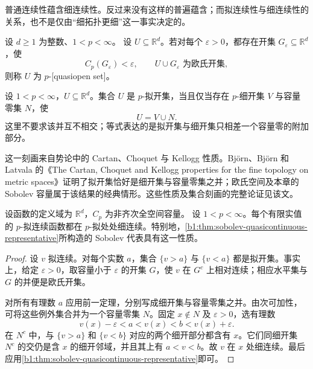 普通连续性蕴含细连续性。反过来没有这样的普遍蕴含；而拟连续性与细连续性的关系，也不是仅由“细拓扑更细”这一事实决定的。

\begin{definition}\label{b1:def:p-quasiopen-set}
设 \(d\geq1\) 为整数、\(1<p<\infty\)。
设 \(U\subseteq\mathbb R^d\)。若对每个 \(\varepsilon>0\)，都存在开集 \(G_\varepsilon\subseteq\mathbb R^d\)，使
\[
 C_p(G_\varepsilon)<\varepsilon,\qquad
 U\cup G_\varepsilon\text{ 为欧氏开集},
\]
则称 \(U\) 为 \(p\)-[quasiopen set]。
\end{definition}

\begin{theorem}[拟开集的细拓扑刻画]\label{b1:thm:p-quasiopen-fine-characterization}
设 \(1<p<\infty\)，\(U\subseteq\mathbb R^d\)。集合 \(U\) 是 \(p\)-拟开集，当且仅当存在 \(p\)-细开集 \(V\) 与容量零集 \(N\)，使
\[
 U=V\cup N.
\]
这里不要求该并互不相交；等式表达的是拟开集与细开集只相差一个容量零的附加部分。
\end{theorem}
\begin{proofsketch}
这一刻画来自势论中的 Cartan、Choquet 与 Kellogg 性质。Björn、Björn 和 Latvala 的《The Cartan, Choquet and Kellogg properties for the fine topology on metric spaces》\cite[Theorem 1.4 and Section 8]{Bjorn2018Cartan}证明了拟开集恰好是细开集与容量零集之并；欧氏空间及本章的 Sobolev 容量属于该结果的经典情形。这些性质及集合刻画的完整论证见该文。
\end{proofsketch}

\begin{corollary}\label{b1:thm:quasicontinuous-fine-continuity}
设函数的定义域为 \(\mathbb R^d\)，\(C_p\) 为非齐次全空间容量。
设 \(1<p<\infty\)。每个有限实值的 \(p\)-拟连续函数都在 \(p\)-拟处处细连续。特别地，\cref{b1:thm:sobolev-quasicontinuous-representative}所构造的 Sobolev 代表具有这一性质。
\end{corollary}
\begin{proof}
设 \(v\) 拟连续。对每个实数 \(a\)，集合 \(\{v>a\}\) 与 \(\{v<a\}\) 都是拟开集。事实上，给定 \(\varepsilon>0\)，取容量小于 \(\varepsilon\) 的开集 \(G\)，使 \(v\) 在 \(G^c\) 上相对连续；相应水平集与 \(G\) 的并便是欧氏开集。

对所有有理数 \(a\) 应用前一定理，分别写成细开集与容量零集之并。由次可加性，可将这些例外集合并为一个容量零集 \(N\)。固定 \(x\notin N\) 及 \(\varepsilon>0\)，选有理数
\[
 v(x)-\varepsilon<a<v(x)<b<v(x)+\varepsilon.
\]
在 \(N^c\) 中，与 \(\{v>a\}\) 和 \(\{v<b\}\) 对应的两个细开部分都含有 \(x\)。它们同细开集 \(N^c\) 的交仍是含 \(x\) 的细开邻域，并且其上有 \(a<v<b\)。故 \(v\) 在 \(x\) 处细连续。最后应用\cref{b1:thm:sobolev-quasicontinuous-representative}即可。
\end{proof}

